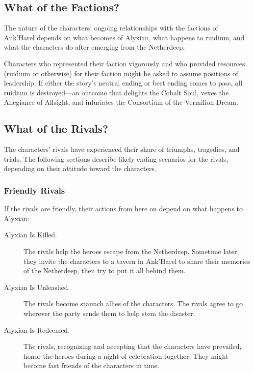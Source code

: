 \documentclass[a4paper, 11pt, bg=full, twocolumn, nooutline]{dndbook}
\begin{document}
\subsection{What of the Factions?}

The nature of the characters' ongoing relationships with the factions of Ank'Harel depends on what becomes of Alyxian, what happens to ruidium, and what the characters do after emerging from the Netherdeep.

Characters who represented their faction vigorously and who provided resources (ruidium or otherwise) for their faction might be asked to assume positions of leadership. If either the story's neutral ending or best ending comes to pass, all ruidium is destroyed---an outcome that delights the Cobalt Soul, vexes the Allegiance of Allsight, and infuriates the Consortium of the Vermilion Dream.


\subsection{What of the Rivals?}

The characters' rivals have experienced their share of triumphs, tragedies, and trials. The following sections describe likely ending scenarios for the rivals, depending on their attitude toward the characters.

\subsubsection{Friendly Rivals}

If the rivals are friendly, their actions from here on depend on what happens to Alyxian:

\begin{description}
\item[Alyxian Is Killed.] The rivals help the heroes escape from the Netherdeep. Sometime later, they invite the characters to a tavern in Ank'Harel to share their memories of the Netherdeep, then try to put it all behind them.
\item[Alyxian Is Unleashed.] The rivals become staunch allies of the characters. The rivals agree to go wherever the party sends them to help stem the disaster.
\item[Alyxian Is Redeemed.] The rivals, recognizing and accepting that the characters have prevailed, honor the heroes during a night of celebration together. They might become fast friends of the characters in time.
\end{description}
\end{document}
